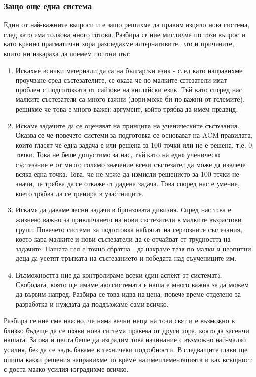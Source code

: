 \documentclass[a4paper,12pt]{article}
\begin{document}
  \subsubsection{Защо още една система}
  
  Един от най-важните въпроси и е защо решихме да правим изцяло нова система, след като има толкова много готови. Разбира се ние мислихме по този въпрос и като крайно прагматични хора разгледахме алтернативите. Ето и причините, които ни накараха да поемем по този път:
  
  \begin{enumerate}
    \item Искахме всички материали да са на български език - след като направихме проучване сред състезателите, се оказа че по-малките сстезатели имат проблем с подготовката от сайтове на английски език. Тъй като според нас малките състезатели са много важни (дори може би по-важни от големите), решихме че това е много важен аргумент, който трябва да имем предвид.
    \item Искаме задачите да се оценяват на принципа на ученическите състезания. Оказва се че повечето системи за подготовка се основават на ACM правилата, които гласят че една задача е или решена за 100 точки или не е решена, т.е. 0 точки. Това не беше допустимо за нас, тъй като на едно ученическо състезание е от много голямо значение всеки състезател да може да извлече всяка една точка. Това, че не може да измисли решението за 100 точки не значи, че трябва да се откаже от дадена задача. Това според нас е умение, което трябва да се тренира в участниците.
    \item Искаме да даваме лесни задачи в бронзовата дивизия. Спред нас това е жизнено важно за привличането на нови състезатели в малките възрастови групи. Повечето системи за подготовка наблягат на сериозните състезания, което кара малките и нови състезатели да се отчайват от трудността на задачите. Нашата цел е точно обратна - да накраме тези по-малки и неопитни деца да усетят тръпката на състезанието и победата над съучениците им.
    \item Възможността ние да контролираме всеки един аспект от системата. Свободата, която ще имаме ако системата е наша е много важна за да можем да вървим напред. Разбира се това идва на цена: повече време отделено за разработка и нуждата да поддържаме сами всичко.
  \end{enumerate}
  
  Разбира се ние сме наясно, че няма вечни неща на този свят и е възможно в близко бъдеще да се появи нова система правена от други хора, която да засенчи нашата. Затова и целта беше да изградим това начинание с възможно най-малко усилия, без да се задълбаваме в техничеки подробности. В следващите глави ще опиша какви решения направихме по време на имеплементацията и как всъщност с доста малко усилия изградихме всичко.
  
\end{document}
